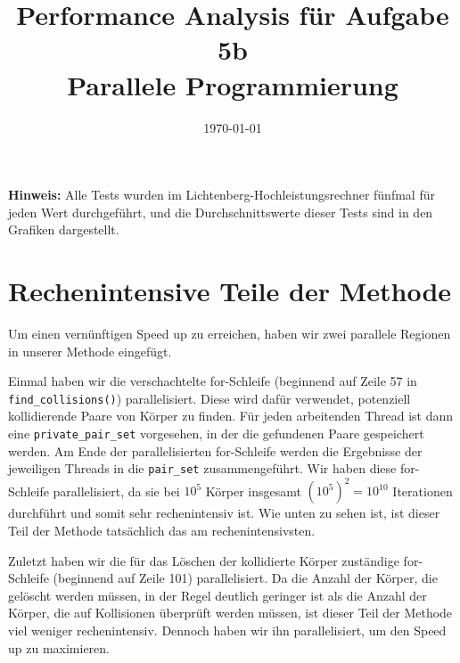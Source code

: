 \documentclass[
  ngerman,
  color=8c,
  submission,
  boxarc,
  fleqn,
]{rubos-tuda-template}
\date{\today}
\begin{document}
\title[Parallele Programmierung]{Performance Analysis für Aufgabe 5b\\ Parallele Programmierung}

\maketitle{}
\textbf{Hinweis:} Alle Tests wurden im Lichtenberg-Hochleistungsrechner fünfmal für jeden Wert durchgeführt, und die Durchschnittswerte dieser Tests sind in den Grafiken dargestellt.

\section{Rechenintensive Teile der Methode}
Um einen vernünftigen Speed up zu erreichen, haben wir zwei parallele Regionen in unserer Methode eingefügt.

Einmal haben wir die verschachtelte for-Schleife (beginnend auf Zeile 57 in \verb|find_collisions()|) parallelisiert. Diese wird dafür verwendet, potenziell kollidierende Paare von Körper zu finden. Für jeden arbeitenden Thread ist dann eine \verb|private_pair_set| vorgesehen, in der die gefundenen Paare gespeichert werden. Am Ende der parallelisierten for-Schleife werden die Ergebnisse der jeweiligen Threads in die \verb|pair_set| zusammengeführt. Wir haben diese for-Schleife parallelisiert, da sie bei $10^5$ Körper insgesamt $(10^5)^2 = 10^{10}$ Iterationen durchführt und somit sehr rechenintensiv ist. Wie unten zu sehen ist, ist dieser Teil der Methode tatsächlich das am rechenintensivsten.

Zuletzt haben wir die für das Löschen der kollidierte Körper zuständige for-Schleife (beginnend auf Zeile 101) parallelisiert. Da die Anzahl der Körper, die gelöscht werden müssen, in der Regel deutlich geringer ist als die Anzahl der Körper, die auf Kollisionen überprüft werden müssen, ist dieser Teil der Methode viel weniger rechenintensiv. Dennoch haben wir ihn parallelisiert, um den Speed up zu maximieren. \newline
\end{document}
